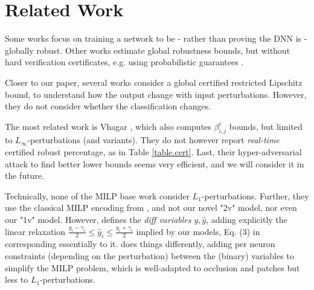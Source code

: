 \section{Related Work}

Some works \cite{Leino,Zhang22a,Sun22,Chen21,REGLO} focus on training a network to be - rather than proving the DNN is - globally robust.
Other works \cite{Bastani16,Ruan19,Gopinath18} estimate global robustness bounds, but without hard verification certificates, e.g. using probabilistic guarantees 
\cite{Levy23,Mangal19}.

Closer to our paper, several works  \cite{Marabou,lipshitz,ITNE,GROCET} consider a global certified restricted Lipschitz bound, to understand how the output change with input perturbations. However, they do not consider whether the classification changes. 

The most related work is Vhagar \cite{vhagar}, which also computes $\beta^\varepsilon_{i,j}$ bounds, but limited to $L_\infty$-perturbations (and variants). They do not however report {\em real-time} certified robust percentage, as in Table \ref{table.cert}. Last, their hyper-adversarial attack to find better lower bounds seems very efficient, and we will consider it in the future.

Technically, none of the MILP base work \cite{vhagar,lipshitz,ITNE} 
consider $L_1$-perturbations. Further, they use the classical MILP encoding from \cite{MILP}, and not our novel "2v" model, nor even our "1v" model. However, \cite{ITNE} 
defines the {\em diff variables} $y,\hat{y}$, adding explicitly the linear relaxation $\frac{y_i-\gamma_i}{2} \leq \hat{y}_i \leq \frac{y_i+\gamma_i}{2}$ implied by our models, Eq. (3) in \cite{ITNE} corresponding essentially to it. \cite{vhagar} does things differently, adding per neuron constraints (depending on the perturbation) between the (binary) variables to simplify the MILP problem, which is well-adapted to occlusion and patches but less to $L_1$-perturbations. 


